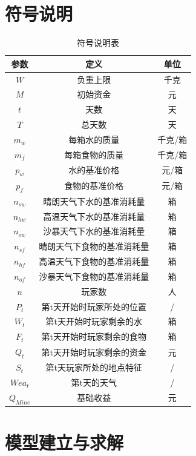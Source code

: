 \documentclass[withoutpre]{cumcmthesis} %
\begin{document}
\section{符号说明}
\begin{table}[H]
    \caption{符号说明表}\label{tab:001} \centering
    \begin{tabular}{ccc}
        \toprule[1.5pt]
        \textbf{参数} & \textbf{定义} & \textbf{单位}\\
        \midrule[1pt]
        $W$ & 负重上限 & 千克\\ 
        $M$ & 初始资金 & 元 \\
        $t$ & 天数 & 天\\
        $T$ & 总天数 & 天\\
        $m_w$ & 每箱水的质量 & 千克/箱\\
        $m_f$ & 每箱食物的质量 & 千克/箱 \\
        $p_w$ & 水的基准价格 & 元/箱\\
        $p_f$ & 食物的基准价格 & 元/箱\\
        $n_{sw}$ & 晴朗天气下水的基准消耗量 & 箱\\
        $n_{hw}$ & 高温天气下水的基准消耗量 & 箱\\
        $n_{ow}$ & 沙暴天气下水的基准消耗量 & 箱\\
        $n_{sf}$ & 晴朗天气下食物的基准消耗量 & 箱\\
        $n_{hf}$ & 高温天气下食物的基准消耗量 & 箱\\
        $n_{of}$ & 沙暴天气下食物的基准消耗量 & 箱\\
        $n$ & 玩家数 & 人 \\
        $P_{t}$ & 第t天开始时玩家所处的位置 & / \\
        $W_{t}$ & 第t天开始时玩家剩余的水 & 箱 \\
        $F_{t}$ & 第t天开始时玩家剩余的食物 & 箱 \\ 
        $Q_{t}$ & 第t天开始时玩家剩余的资金 & 元 \\
        $S_{t}$ & 第t天玩家所处的地点特征 & /\\
        $Wea_t$ & 第t天的天气 & /\\
        $Q_{Mine}$ & 基础收益 & 元\\
        
        \bottomrule[1.5pt]
    \end{tabular}
\end{table}


\section{模型建立与求解}
\end{document}
